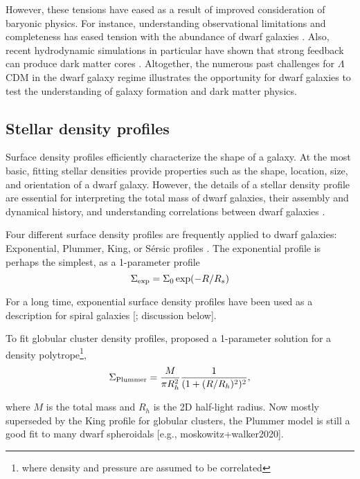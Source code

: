 However, these tensions have eased as a result of improved consideration
of baryonic physics. For instance, understanding observational
limitations and completeness has eased tension with the abundance of
dwarf galaxies \citep[e.g.,][]{kim+peter+hargis2018}. Also, recent
hydrodynamic simulations in particular have shown that strong feedback
can produce dark matter cores
\citep[e.g.,][]{tollet+2016, fitts+2017, orkney+2021}. Altogether, the
numerous past challenges for \(\Lambda\)CDM in the dwarf galaxy regime
illustrates the opportunity for dwarf galaxies to test the understanding
of galaxy formation and dark matter physics.

\subsection{Stellar density profiles}\label{stellar-density-profiles}

Surface density profiles efficiently characterize the shape of a galaxy.
At the most basic, fitting stellar densities provide properties such as
the shape, location, size, and orientation of a dwarf galaxy. However,
the details of a stellar density profile are essential for interpreting
the total mass of dwarf galaxies, their assembly and dynamical history,
and understanding correlations between dwarf galaxies
\citep[e.g.,][\citet{penarrubia+2009}, \citet{querci+2025},
\citet{lee+2018}]{herrmann+hunter+elmegreen2013}.

Four different surface density profiles are frequently applied to dwarf
galaxies: Exponential, Plummer, King, or Sérsic profiles
\citep[e.g.,][]{munoz+18}. The exponential profile is perhaps the
simplest, as a 1-parameter profile \begin{equation}{
\Sigma_{\rm exp} = \Sigma_0\exp(-R / R_s)
}\end{equation}

For a long time, exponential surface density profiles have been used as
a description for spiral galaxies {[}\citet{mateo1998}; discussion
below{]}.

To fit globular cluster density profiles, \citet{plummer1911} proposed a
1-parameter solution for a density polytrope\footnote{where density and
  pressure are assumed to be correlated}, \begin{equation}{
\Sigma_{\rm Plummer} = \frac{M}{\pi R_h^2}\frac{1}{(1 + (R/R_h)^2)^2},
}\end{equation}

where \(M\) is the total mass and \(R_h\) is the 2D half-light radius.
Now mostly superseded by the King profile for globular clusters, the
Plummer model is still a good fit to many dwarf spheroidals {[}e.g.,
moskowitz+walker2020{]}.

